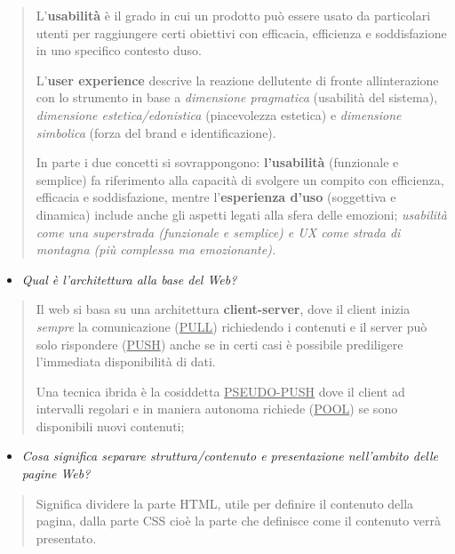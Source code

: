 \begin{quote}
L'\textbf{usabilità} è il grado in cui un prodotto può essere usato da
particolari utenti per raggiungere certi obiettivi con efficacia,
efficienza e soddisfazione in uno specifico contesto
d\textquotesingle uso.

L'\textbf{user experience} descrive la reazione
dell\textquotesingle utente di fronte all\textquotesingle interazione
con lo strumento in base a \emph{dimensione pragmatica} (usabilità del
sistema), \emph{dimensione estetica/edonistica} (piacevolezza estetica)
e \emph{dimensione simbolica} (forza del brand e identificazione).

In parte i due concetti si sovrappongono: \textbf{l'usabilità}
(funzionale e semplice) fa riferimento alla capacità di svolgere un
compito con efficienza, efficacia e soddisfazione, mentre
l'\textbf{esperienza d'uso} (soggettiva e dinamica) include anche gli
aspetti legati alla sfera delle emozioni; \emph{usabilità come una
superstrada (funzionale e semplice) e UX come strada di montagna (più
complessa ma emozionante).}
\end{quote}

\begin{itemize}
\item
  \emph{Qual è l'architettura alla base del Web?}
\end{itemize}

\begin{quote}
Il web si basa su una architettura \textbf{client-server}, dove il
client inizia \emph{sempre} la comunicazione (\ul{PULL}) richiedendo i
contenuti e il server può solo rispondere (\ul{PUSH}) anche se in certi
casi è possibile prediligere l'immediata disponibilità di dati.

Una tecnica ibrida è la cosiddetta \ul{PSEUDO-PUSH} dove il client ad
intervalli regolari e in maniera autonoma richiede (\ul{POOL}) se sono
disponibili nuovi contenuti;
\end{quote}

\begin{itemize}
\item
  \emph{Cosa significa separare struttura/contenuto e presentazione
  nell'ambito delle pagine Web?}
\end{itemize}

\begin{quote}
Significa dividere la parte HTML, utile per definire il contenuto della
pagina, dalla parte CSS cioè la parte che definisce come il contenuto
verrà presentato.
\end{quote}

